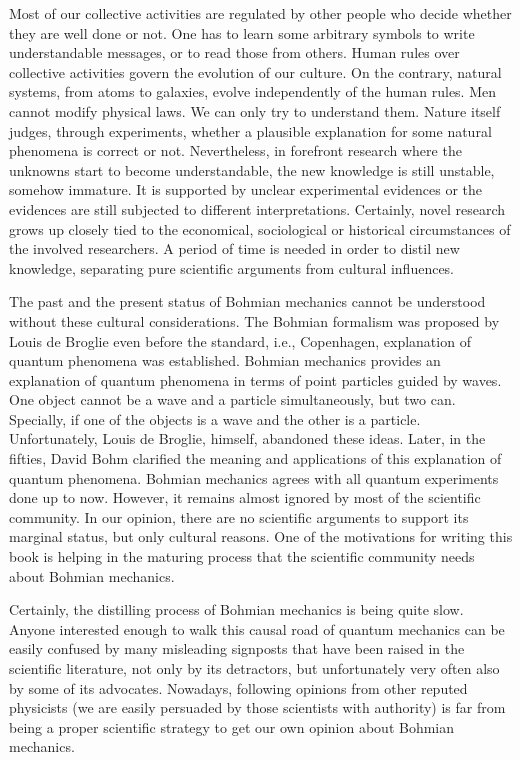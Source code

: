 \documentclass[onecolumn,nofootinbib, secnumarabic, amsmath, nobibnotes,12pt,aps,pra]{revtex4-1}
\begin{document}
Most of our collective activities are regulated by other people who decide whether they are well done or not. One has to learn some arbitrary symbols to write understandable messages, or to read those from others. Human rules over collective activities govern the evolution of our culture. On the contrary, natural systems, from atoms to galaxies, evolve independently of the human rules. Men cannot modify physical laws. We can only try to understand them. Nature itself judges, through experiments, whether a plausible explanation for some natural phenomena is correct or not. Nevertheless, in forefront research where the unknowns start to become understandable, the new knowledge is still unstable, somehow immature. It is supported by unclear experimental evidences or the evidences are still subjected to different interpretations. Certainly, novel research grows up closely tied to the economical, sociological or historical circumstances of the involved researchers.  A period of time is needed in order to distil new knowledge, separating pure scientific arguments from cultural influences.

The past and the present status of Bohmian mechanics cannot be understood without these cultural considerations. The Bohmian formalism was proposed by Louis de Broglie even before the standard, i.e., Copenhagen, explanation of quantum phenomena was established.
Bohmian mechanics provides an explanation of quantum phenomena in terms of point particles guided by waves.
One object cannot be a wave and a particle simultaneously, but two can. Specially, if one of the objects is a wave and the other is a particle. 
Unfortunately, Louis de Broglie, himself, abandoned these ideas. Later, in the fifties, David Bohm clarified the meaning and applications of this explanation of quantum phenomena. Bohmian mechanics agrees with all quantum experiments done up to now. However, it remains almost ignored by most of the scientific community. In our opinion, there are no scientific arguments to support its marginal status, but only cultural reasons. One of the motivations for writing this book is helping in the maturing process that the scientific community needs about Bohmian mechanics.

Certainly, the distilling process of Bohmian mechanics is being quite slow. Anyone interested enough to walk this causal road of quantum mechanics can be easily confused by many misleading signposts that have been raised in the scientific literature, not only by its detractors, but unfortunately very often also by some of its advocates. Nowadays, following opinions from other reputed physicists (we are easily persuaded by those scientists with authority) is far from being a proper scientific strategy to get our own opinion about Bohmian mechanics.
\end{document}
